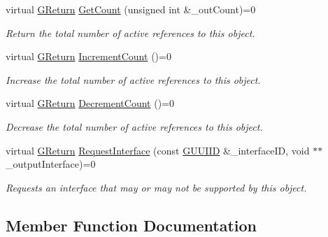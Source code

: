 \begin{DoxyCompactItemize}
virtual \mbox{\hyperlink{namespaceGW_a67a839e3df7ea8a5c5686613a7a3de21}{G\+Return}} \mbox{\hyperlink{classGW_1_1AUDIO_1_1GMusic_ae41f54531b8325848215596fb2f821ac}{Get\+Count}} (unsigned int \&\+\_\+out\+Count)=0
\begin{DoxyCompactList}\small\item\em Return the total number of active references to this object. \end{DoxyCompactList}\item 
virtual \mbox{\hyperlink{namespaceGW_a67a839e3df7ea8a5c5686613a7a3de21}{G\+Return}} \mbox{\hyperlink{classGW_1_1AUDIO_1_1GMusic_a22d7a170b4d307e5398ebb92f950431f}{Increment\+Count}} ()=0
\begin{DoxyCompactList}\small\item\em Increase the total number of active references to this object. \end{DoxyCompactList}\item 
virtual \mbox{\hyperlink{namespaceGW_a67a839e3df7ea8a5c5686613a7a3de21}{G\+Return}} \mbox{\hyperlink{classGW_1_1AUDIO_1_1GMusic_a1385376fffc42c40f5922b4722d10b5c}{Decrement\+Count}} ()=0
\begin{DoxyCompactList}\small\item\em Decrease the total number of active references to this object. \end{DoxyCompactList}\item 
virtual \mbox{\hyperlink{namespaceGW_a67a839e3df7ea8a5c5686613a7a3de21}{G\+Return}} \mbox{\hyperlink{classGW_1_1AUDIO_1_1GMusic_a45b07d7915cfe61ab27338c42b78dcfb}{Request\+Interface}} (const \mbox{\hyperlink{structGW_1_1GUUIID}{G\+U\+U\+I\+ID}} \&\+\_\+interface\+ID, void $\ast$$\ast$\+\_\+output\+Interface)=0
\begin{DoxyCompactList}\small\item\em Requests an interface that may or may not be supported by this object. \end{DoxyCompactList}\end{DoxyCompactItemize}


\subsection{Member Function Documentation}
\mbox{\label{classGW_1_1AUDIO_1_1GMusic_a1385376fffc42c40f5922b4722d10b5c}} 
